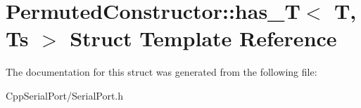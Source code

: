 \hypertarget{struct_permuted_constructor_1_1has___t}{}\section{Permuted\+Constructor\+:\+:has\+\_\+T$<$ T, Ts $>$ Struct Template Reference}
\label{struct_permuted_constructor_1_1has___t}


The documentation for this struct was generated from the following file\+:\begin{DoxyCompactItemize}
\item 
Cpp\+Serial\+Port/Serial\+Port.\+h\end{DoxyCompactItemize}
